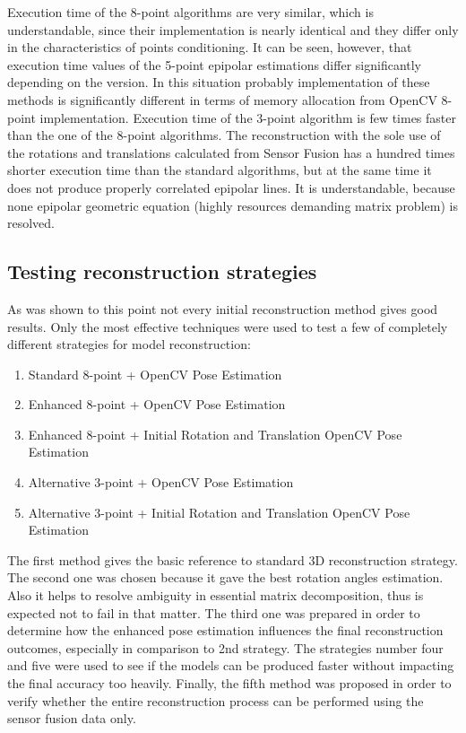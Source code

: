 Execution time of the 8-point algorithms are very similar, which is understandable, since their implementation is nearly identical and they differ only in the characteristics of points conditioning. It can be seen, however, that execution time values of the 5-point epipolar estimations differ significantly depending on the version. In this situation probably implementation of these methods is significantly different in terms of memory allocation from OpenCV 8-point implementation. Execution time of the 3-point algorithm is few times faster than the one of the 8-point algorithms. The reconstruction with the sole use of the rotations and translations calculated from Sensor Fusion has a hundred times shorter execution time than the standard algorithms, but at the same time it does not produce properly correlated epipolar lines. It is understandable, because none epipolar geometric equation (highly resources demanding matrix problem) is resolved. 

\subsection{Testing reconstruction strategies}
As was shown to this point not every initial reconstruction method gives good results. Only the most effective techniques were used to test a few of completely different strategies for model reconstruction:
\begin{enumerate}
\item \textnormal{Standard 8-point + OpenCV Pose Estimation} 
\item \textnormal{Enhanced 8-point + OpenCV Pose Estimation} 
\item \textnormal{Enhanced 8-point + Initial Rotation and Translation OpenCV Pose Estimation} 
\item \textnormal{Alternative 3-point + OpenCV Pose Estimation}
\item \textnormal{Alternative 3-point + Initial Rotation and Translation OpenCV Pose Estimation}
\end{enumerate}
The first method gives the basic reference to standard 3D reconstruction strategy. The second one was chosen because it gave the best rotation angles estimation. Also it helps to resolve ambiguity in essential matrix decomposition, thus is expected not to fail in that matter. The third one was prepared in order to determine how the enhanced pose estimation influences the final reconstruction outcomes, especially in comparison to 2nd strategy. The strategies number four and five were used to see if the models can be produced faster without impacting the final accuracy too heavily. Finally, the fifth method was proposed in order to verify whether the entire reconstruction process can be performed using the sensor fusion data only.
